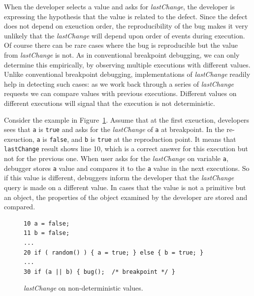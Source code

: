 \documentclass[runningheads,a4paper]{llncs}
\begin{document}
When the developer selects a value and
asks for \textit{lastChange}, the developer is expressing the hypothesis that
the value is related to the defect. Since the defect does not depend on
 exeuction order, the reproducibility of
the bug makes it very unlikely that the \textit{lastChange} will
depend upon order of events during execution.
Of course there can be rare cases where the bug is reproducible but the
value from \textit{lastChange} is not. As in conventional breakpoint
debugging, we can only determine this empirically, by observing
multiple executions with different values. Unlike conventional
breakpoint debugging, implementations of \textit{lastChange} readily
help in detecting such cases: as we work back through a series of
\textit{lastChange} requests we can compare values with previous
executions. Different values on different executions will signal that
the execution is not deterministic. 

Consider the example in Figure~\ref{fig:nondeterministic-values}. 
Assume that at the first exeuction, developers sees that \texttt{a} is \texttt{true} and asks
for the \textit{lastChange} of \texttt{a} at breakpoint. In the re-exeuction, \texttt{a} is \texttt{false},
and \texttt{b} is \texttt{true} at the reproduction point. It means that \texttt{lastChange}
result shows line 10, which is a correct answer for this execution but not for the previous one.
When user asks for the \textit{lastChange} on variable \texttt{a}, debugger stores \texttt{a} value and compares
it to the \texttt{a} value in the next executions. So if this value is different, debuggers inform the developer
that the \textit{lastChange} query is made on a different value. In cases that the value is not a primitive but an object,
the properties of the object examined by the developer are stored and compared.

\begin{figure}[htp]
\begin{verbatim}
10 a = false;
11 b = false;
...
20 if ( random() ) { a = true; } else { b = true; }
...
30 if (a || b) { bug();  /* breakpoint */ }
\end{verbatim}
\caption{\textit{lastChange} on non-deterministic values.}
\label{fig:nondeterministic-values}
\end{figure}
\end{document}
